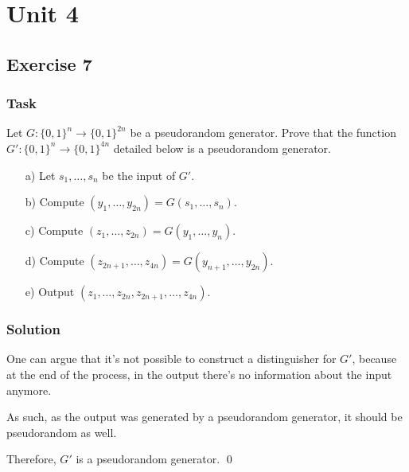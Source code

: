 \chapter{Unit 4}
\section{Exercise 7}

\subsection{Task}

Let $G : \{0, 1\}^n \to \{0, 1\}^{2n}$ be a pseudorandom generator. Prove that
the function $G' : \{0, 1\}^n \to \{0, 1\}^{4n}$ detailed below is a pseudorandom
generator.
\begin{enumerate}
    \item[a)] Let $s_1, \ldots, s_n$ be the input of $G'$.
    \item[b)] Compute $(y_1, \ldots, y_{2n}) = G(s_1, \ldots, s_n)$.
    \item[c)] Compute $(z_1, \ldots, z_{2n}) = G(y_1, \ldots, y_n)$.
    \item[d)] Compute $(z_{2n+1}, \ldots, z_{4n}) = G(y_{n+1}, \ldots, y_{2n})$.
    \item[e)] Output $(z_1, \ldots, z_{2n}, z_{2n+1}, \ldots, z_{4n})$.
\end{enumerate}

\subsection{Solution}

One can argue that it's not possible to construct a distinguisher for $G'$, because at the end of the process, in the output there's no information about the input anymore.

As such, as the output was generated by a pseudorandom generator, it should be pseudorandom as well.

Therefore, $G'$ is a pseudorandom generator. \qed
